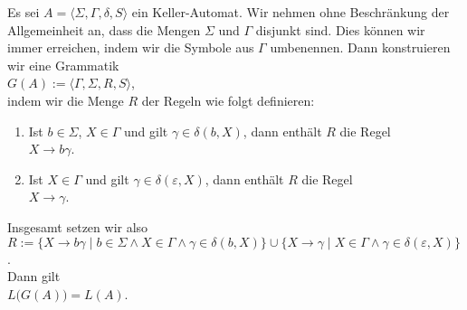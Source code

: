 \begin{Satz} \label{satz:keller2grammar}
  Es sei $A = \langle \Sigma, \Gamma, \delta, S \rangle$ ein Keller-Automat.  Wir nehmen
  ohne Beschr\"ankung der Allgemeinheit an, dass die Mengen $\Sigma$ und $\Gamma$ disjunkt
  sind.  Dies k\"onnen wir immer erreichen, indem wir die Symbole aus $\Gamma$ umbenennen.
  Dann konstruieren wir eine Grammatik 
  \\[0.2cm]
  \hspace*{1.3cm}
  $G(A) := \langle \Gamma, \Sigma, R, S \rangle$,
  \\[0.2cm]
  indem wir die Menge $R$ der Regeln wie folgt definieren:
  \begin{enumerate}
  \item Ist $b \in \Sigma$, $X \in \Gamma$ und gilt $\gamma \in \delta(b,X)$,
        dann enth\"alt $R$ die Regel
        \\[0.2cm]
        \hspace*{1.3cm}
        $X \rightarrow b\gamma$.
  \item Ist $X \in \Gamma$ und gilt $\gamma \in \delta(\varepsilon, X)$,
        dann enth\"alt $R$ die Regel 
        \\[0.2cm]
        \hspace*{1.3cm}
        $X \rightarrow \gamma$.
  \end{enumerate}
  Insgesamt setzen wir also
  \\[0.2cm]
  \hspace*{1.3cm}
  $R := \bigl\{ X \rightarrow b\gamma \mid b\in\Sigma \wedge X\in\Gamma \wedge \gamma \in \delta(b,X) \bigr\} \cup 
        \bigl\{ X \rightarrow \gamma \mid X\in\Gamma \wedge \gamma \in \delta(\varepsilon,X) \bigr\}$.
  \\[0.2cm]
  Dann gilt 
  \\[0.2cm]
  \hspace*{1.3cm}
  $L\bigl(G(A)\bigr) = L(A)$.
\end{Satz}

